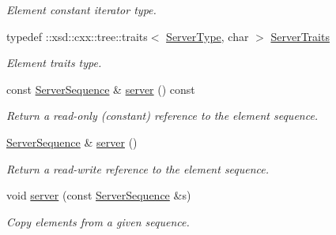 \begin{DoxyCompactItemize}
\begin{DoxyCompactList}\small\item\em Element constant iterator type. \item\end{DoxyCompactList}\item 
\hypertarget{classopenstack_1_1xml_1_1ServerIDList_a2e9e4e22fd614823aa35dec70dfee0ba}{
typedef ::xsd::cxx::tree::traits$<$ \hyperlink{classopenstack_1_1xml_1_1ServerID}{ServerType}, char $>$ \hyperlink{classopenstack_1_1xml_1_1ServerIDList_a2e9e4e22fd614823aa35dec70dfee0ba}{ServerTraits}}
\label{classopenstack_1_1xml_1_1ServerIDList_a2e9e4e22fd614823aa35dec70dfee0ba}

\begin{DoxyCompactList}\small\item\em Element traits type. \item\end{DoxyCompactList}\item 
const \hyperlink{classopenstack_1_1xml_1_1ServerIDList_a76966a1d164f92e19cbe3c2c573475e2}{ServerSequence} \& \hyperlink{classopenstack_1_1xml_1_1ServerIDList_a0f057b2f65e68fe09710f670182a988d}{server} () const 
\begin{DoxyCompactList}\small\item\em Return a read-\/only (constant) reference to the element sequence. \item\end{DoxyCompactList}\item 
\hyperlink{classopenstack_1_1xml_1_1ServerIDList_a76966a1d164f92e19cbe3c2c573475e2}{ServerSequence} \& \hyperlink{classopenstack_1_1xml_1_1ServerIDList_aca08b990c03df95f32b86c2c97c788fe}{server} ()
\begin{DoxyCompactList}\small\item\em Return a read-\/write reference to the element sequence. \item\end{DoxyCompactList}\item 
void \hyperlink{classopenstack_1_1xml_1_1ServerIDList_a636cb1e24fbda9660f26a24f7c826133}{server} (const \hyperlink{classopenstack_1_1xml_1_1ServerIDList_a76966a1d164f92e19cbe3c2c573475e2}{ServerSequence} \&s)
\begin{DoxyCompactList}\small\item\em Copy elements from a given sequence. \item\end{DoxyCompactList}\end{DoxyCompactItemize}
